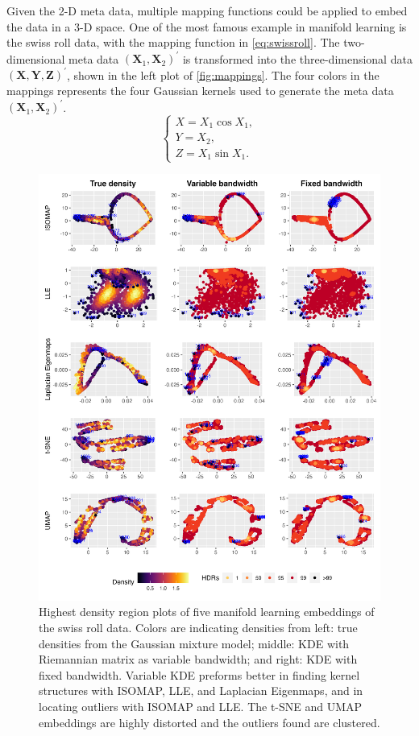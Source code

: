 \documentclass[11pt,a4paper,]{article}
\begin{document}
Given the 2-D meta data, multiple mapping functions could be applied to embed the data in a 3-D space. One of the most famous example in manifold learning is the swiss roll data, with the mapping function in \eqref{eq:swissroll}. The two-dimensional meta data \((\pmb{X}_1, \pmb{X}_2)^\prime\) is transformed into the three-dimensional data \((\pmb{X}, \pmb{Y}, \pmb{Z})^\prime\), shown in the left plot of \autoref{fig:mappings}. The four colors in the mappings represents the four Gaussian kernels used to generate the meta data \((\pmb{X}_1, \pmb{X}_2)^\prime\).
\begin{equation}
\label{eq:swissroll}
\left\{
\begin{array}{lcl}
X = X_1 \cos{X_1}, \\
Y = X_2, \\
Z = X_1 \sin{X_1}.
\end{array}
\right.
\end{equation}

\begin{figure}

{\centering \includegraphics[width=0.95\linewidth]{figures/Swiss Roll5levels_outliers_comparison_4ml_3cases_riem0_08} 

}

\caption{Highest density region plots of five manifold learning embeddings of the swiss roll data. Colors are indicating densities from left: true densities from the Gaussian mixture model; middle: KDE with Riemannian matrix as variable bandwidth; and right: KDE with fixed bandwidth. Variable KDE preforms better in finding kernel structures with ISOMAP, LLE, and Laplacian Eigenmaps, and in locating outliers with ISOMAP and LLE. The t-SNE and UMAP embeddings are highly distorted and the outliers found are clustered.}\label{fig:sroutliers}
\end{figure}
\end{document}
